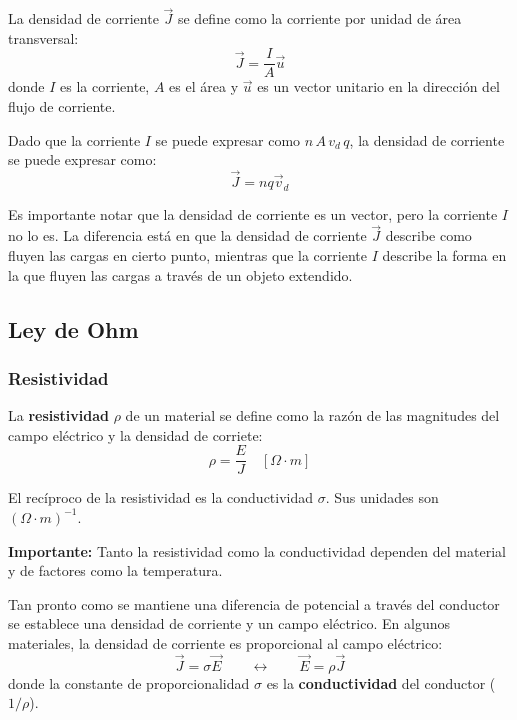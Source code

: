 La densidad de corriente \(\vec{J}\) se define como la corriente por unidad de área transversal:
\[
\vec{J} = \frac{I}{A} \vec{u}
\]
donde \( I \) es la corriente, \( A \) es el área y \( \vec{u} \) es un vector unitario en la dirección del flujo de corriente.

Dado que la corriente \(I\) se puede expresar como \(n \, A\, v_d\, q\), la densidad de corriente se puede expresar como:
\[
\vec{J} = n q \vec{v}_d
\]

Es importante notar que la densidad de corriente es un vector, pero la corriente \(I\) no lo es. La diferencia está en que la densidad de corriente \(\vec{J}\) describe como fluyen las cargas en cierto punto, mientras que la corriente \(I\) describe la forma en la que fluyen las cargas a través de un objeto extendido. 

\subsection{Ley de Ohm}

\subsubsection{Resistividad}

La \textbf{resistividad} \(\rho\) de un material se define como la razón de las magnitudes del campo eléctrico y la densidad de corriete:
\begin{equation}
    \rho = \frac{E}{J} \quad [\Omega \cdot m]
\end{equation}

El recíproco de la resistividad es la conductividad \(\sigma\). Sus unidades son \((\Omega \cdot m)^{-1}\).
\begin{tcolorbox}[myconclusion]
\textbf{Importante:} Tanto la resistividad como la conductividad dependen del material y de factores como la temperatura.
\end{tcolorbox}

Tan pronto como se mantiene una diferencia de potencial a través del conductor se establece una densidad de corriente y un campo eléctrico. En algunos materiales, la densidad de corriente es proporcional al campo eléctrico:
\begin{equation}
\vec{J} = \sigma \vec{E} \qquad \leftrightarrow \qquad \vec{E} = \rho \vec{J}
\label{eq:forma_local_de_la_ley_de_ohm}
\end{equation}
donde la constante de proporcionalidad \(\sigma\) es la \textbf{conductividad} del conductor (\(1/\rho\)).

